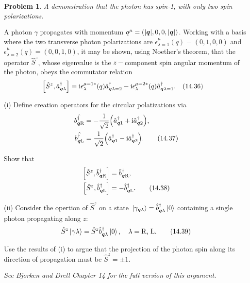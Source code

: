 \documentclass[letterpaper]{article}
\theoremstyle{definition}
\newtheorem{prob}{Problem}[section]
\begin{document}
\begin{prob}
  \emph{A demonstration that the photon has spin-1, with only two spin polarizations.}

  A photon \(\gamma\) propagates with momentum \(q^\mu=(|\vb*{q}|,0,0,|\vb*{q}|)\). Working with a basis where the two transverse photon polarizations are \(\epsilon^\mu_{\lambda=1}(q)=(0,1,0,0)\) and \(\epsilon^\mu_{\lambda=2}(q)=(0,0,1,0)\), it may be shown, using Noether's theorem, that the operator \(\hat{S}^z\), whose eigenvalue is the \(z-\)component spin angular momentum of the photon, obeys the commutator relation \[\bqty{\hat{S}^z,\hat{a}^\dagger_{\vb*{q}\lambda}}=\text{i}\epsilon^{\mu=1*}_\lambda(q)\hat{a}^\dagger_{\vb*{q}\lambda=2}-\text{i}\epsilon^{\mu=2*}_\lambda(q)\hat{a}^\dagger_{\vb*{q}\lambda=1}.\qq{(14.36)}\]

  (i) Define creation operators for the circular polatizations via
  \begin{align*}\hat{b^\dagger_{\vb*{q}\text{R}}} & =-\frac{1}{\sqrt{2}}\pqty{\hat{a}^\dagger_{\vb*{q}1}+\text{i}\hat{a}^\dagger_{\vb*{q}2}},             \\
    \hat{b^\dagger_{\vb*{q}\text{L}}} & =\frac{1}{\sqrt{2}}\pqty{\hat{a}^\dagger_{\vb*{q}1}-\text{i}\hat{a}^\dagger_{\vb*{q}2}}.\qquad(14.37)
  \end{align*}


  Show that\begin{align*}\bqty{\hat{S}^z,\hat{b}^\dagger_{\vb*{q}\text{R}}}&=\hat{b}^\dagger_{\vb*{q}\text{R}},\\\bqty{\hat{S}^z,\hat{b}^\dagger_{\vb*{q}\text{L}}}&=-\hat{b}^\dagger_{\vb*{q}\text{L}}.\qquad(14.38)\end{align*}

  (ii) Consider the opertion of \(\hat{S}^z\) on a state \(\ket*{\gamma_{\vb*{q}\lambda}}=\hat{b}^\dagger_{\vb*{q}\lambda}\ket*{0}\) containing a single photon propagating along \(z\):\[\hat{S}^z\ket*{\gamma\lambda}=\hat{S}^z\hat{b}^\dagger_{\vb*{q}\lambda}\ket*{0}\qcomma\lambda=\text{R, L.}\qquad(14.39)\]

  Use the results of (i) to argue that the projection of the photon spin along its direction of propagation must be \(\hat{S}^z=\pm 1.\)

  \emph{See Bjorken and Drell Chapter 14 for the full version of this argument.}
\end{prob}
\end{document}
